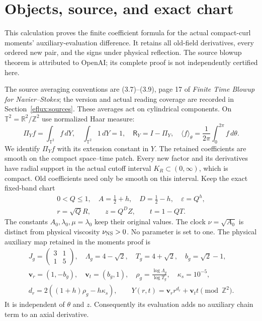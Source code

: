 \section{Objects, source, and exact chart}
\label{eflux:setup}
This calculation proves the finite coefficient formula for the actual
compact-curl moments' auxiliary-evaluation difference. It retains all
old-field derivatives, every ordered new pair, and the signs under
physical reflection. The source blowup theorem is attributed to OpenAI;
its complete proof is not independently certified here.

The source averaging conventions are (3.7)--(3.9), page 17 of
\emph{Finite Time Blowup for Navier--Stokes}; the version and actual
reading coverage are recorded in Section~\ref{eflux:sources}.
These averages act on cylindrical components. On
$\mathbb T^2=\mathbb R^2/\mathbb Z^2$ use normalized Haar measure:
\[
 \Pi_Y f=\int_{\mathbb T^2}f\,dY,\quad \int_{\mathbb T^2}1\,dY=1,\quad
 \mathsf R_Y=I-\Pi_Y,\quad
 \langle f\rangle_\theta=\frac1{2\pi}\int_0^{2\pi}f\,d\theta .
\]
We identify $\Pi_Y f$ with its extension constant in $Y$.
The retained coefficients are smooth on the compact space--time patch.
Every new factor and its derivatives have radial support in the actual
cutoff interval $K_R\subset(0,\infty)$, which is compact.
Old coefficients need only be smooth on this interval.
Keep the exact fixed-band chart
\begin{equation}
\begin{gathered}
0<Q\le1,\quad A=\tfrac12+h,\quad D=\tfrac12-h,\quad\varepsilon=Q^h,\\
r=\sqrt Q R,\qquad z=Q^D Z,\qquad t=1-QT.
\end{gathered}\label{eflux:chart}
\end{equation}
The constants $A_0,\lambda_0,\mu=\lambda_0$ keep their original values.
The clock $\nu=\sqrt{A_0}$ is distinct from physical viscosity
$\nu_{\rm NS}>0$. No parameter is set to one.
The physical auxiliary map retained in the moments proof is
\begin{equation}
\begin{gathered}
J_g=\begin{pmatrix}3&1\\1&5\end{pmatrix},\quad
\Lambda_g=4-\sqrt2,\quad T_g=4+\sqrt2,\quad b_g=\sqrt2-1,\\
\mathbf v_r=(1,-b_g),\quad \mathbf v_t=(b_g,1),\quad
\rho_g=\frac{\log\Lambda_g}{\log T_g},\quad\kappa_s=10^{-5},\\
d_r=2((1+h)\rho_g-h\kappa_s),\qquad
Y(r,t)=\mathbf v_r r^{d_r}+\mathbf v_t t\pmod{\mathbb Z^2}.
\end{gathered}\label{eflux:phase-map}
\end{equation}
It is independent of $\theta$ and $z$. Consequently its evaluation adds
no auxiliary chain term to an axial derivative.

